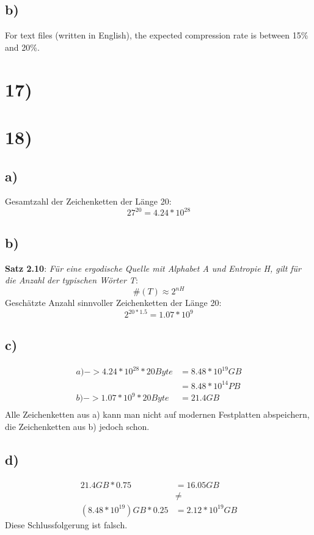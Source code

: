   \subsection*{b)}

  For text files (written in English), the expected compression rate is between 15\% and 20\%.

  \section*{17)}
  \section*{18)}
  
    \subsection*{a)}
    
      Gesamtzahl der Zeichenketten der Länge 20:\\
      \[27^{20} = 4.24 * 10^{28} \]
      
    \subsection*{b)}
    
      \textbf{Satz 2.10}: \textit{Für eine ergodische Quelle mit Alphabet A und Entropie H, gilt für die Anzahl der typischen Wörter T}:
      \[ \#(T) \approx 2^{nH} \]
      \newline
      Geschätzte Anzahl sinnvoller Zeichenketten der Länge 20:
      \[ 2^{20*1.5} = 1.07 * 10^{9} \]
      
    \subsection*{c)}
    
      \begin{equation}
      	\begin{split}
      	  a) -> 4.24 * 10^{28} * 20Byte & = 8.48 * 10^{19} GB \\
      	  & = 8.48 * 10^{14} PB \\
      	  b) -> 1.07 * 10^{9} * 20Byte & = 21.4 GB \\
      	\end{split}
      \end{equation}
      \newline
      Alle Zeichenketten aus a) kann man nicht auf modernen Festplatten abspeichern, die Zeichenketten aus b) jedoch schon.\\
      
    \subsection*{d)}
    
      \begin{equation}
      	\begin{split}
      	  21.4 GB * 0.75 & = 16.05 GB \\ 
      	  & \neq \\
      	  (8.48 * 10^{19}) GB * 0.25 & = 2.12 * 10^{19} GB
      	\end{split}
      \end{equation}
      \newline
      Diese Schlussfolgerung ist falsch.


